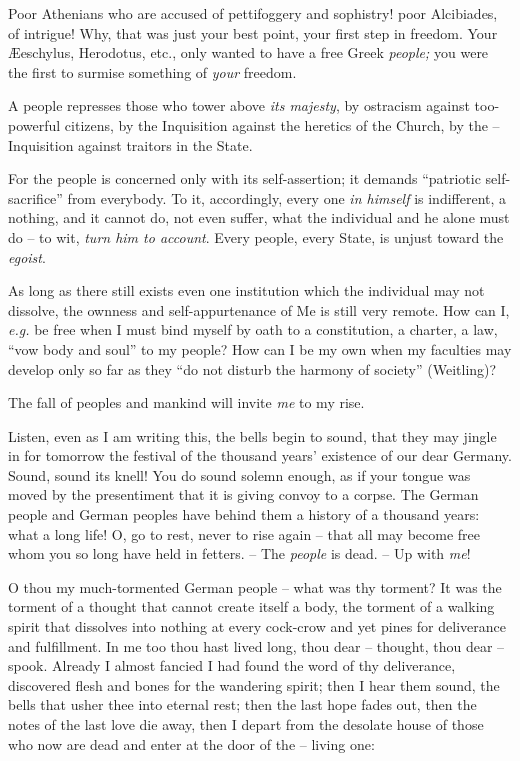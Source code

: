 \documentclass[12pt,a4paper]{book}
\begin{document}
Poor Athenians who are accused of pettifoggery and sophistry! poor Alcibiades, 
of intrigue! Why, that was just your best point, your first step in freedom. 
Your \AE{}eschylus, Herodotus, etc., only wanted to have a free Greek 
\textit{people;} you were the first to surmise something of \textit{your} 
freedom.

A people represses those who tower above \textit{its majesty}, by ostracism 
against too-powerful citizens, by the Inquisition against the heretics of the 
Church, by the -- Inquisition against traitors in the State.

For the people is concerned only with its self-assertion; it demands 
``patriotic self-sacrifice'' from everybody. To it, accordingly, every one 
\textit{in himself} is indifferent, a nothing, and it cannot do, not even 
suffer, what the individual and he alone must do -- to wit, \textit{turn him 
to account}. Every people, every State, is unjust toward the \textit{egoist}.

As long as there still exists even one institution which the individual may 
not dissolve, the ownness and self-appurtenance of Me is still very remote. 
How can I, \textit{e.g.} be free when I must bind myself by oath to a 
constitution, a charter, a law, ``vow body and soul'' to my people? How can 
I be my own when my faculties may develop only so far as they ``do not 
disturb the harmony of society'' (Weitling)?

The fall of peoples and mankind will invite \textit{me} to my rise.

Listen, even as I am writing this, the bells begin to sound, that they may 
jingle in for tomorrow the festival of the thousand years' existence of our 
dear Germany. Sound, sound its knell! You do sound solemn enough, as if your 
tongue was moved by the presentiment that it is giving convoy to a corpse. The 
German people and German peoples have behind them a history of a thousand 
years: what a long life! O, go to rest, never to rise again -- that all may 
become free whom you so long have held in fetters. -- The \textit{people} is 
dead. -- Up with \textit{me}!

O thou my much-tormented German people -- what was thy torment? It was the 
torment of a thought that cannot create itself a body, the torment of a 
walking spirit that dissolves into nothing at every cock-crow and yet pines 
for deliverance and fulfillment. In me too thou hast lived long, thou dear -- 
thought, thou dear -- spook. Already I almost fancied I had found the word of 
thy deliverance, discovered flesh and bones for the wandering spirit; then I 
hear them sound, the bells that usher thee into eternal rest; then the last 
hope fades out, then the notes of the last love die away, then I depart from 
the desolate house of those who now are dead and enter at the door of the -- 
living one:
\end{document}
